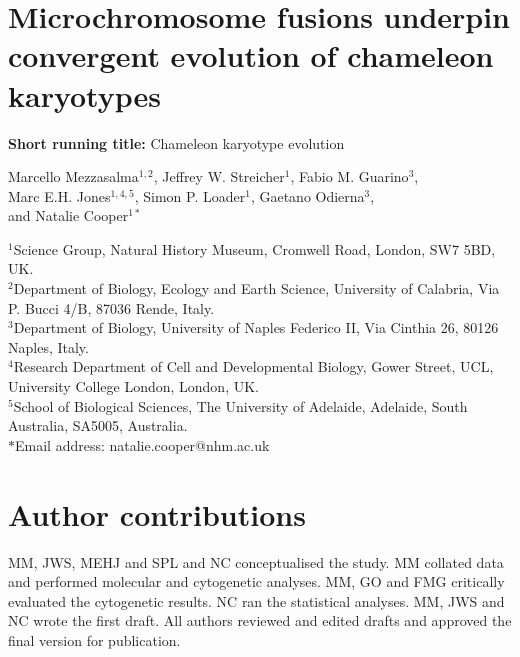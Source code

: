 \documentclass[a4paper, 12pt]{article}
\begin{document}

\section*{Microchromosome fusions underpin convergent evolution of chameleon karyotypes}

\textbf{Short running title:} Chameleon karyotype evolution\\

\begin{centering}

Marcello Mezzasalma$^{1,2}$, 
Jeffrey W. Streicher$^{1}$, 
Fabio M. Guarino$^{3}$,\\ 
Marc E.H. Jones$^{1,4,5}$, 
Simon P. Loader$^{1}$, 
Gaetano Odierna$^{3}$,\\ 
and Natalie Cooper$^{1*}$

\end{centering}

  $^1$Science Group, Natural History Museum, Cromwell Road, London, SW7 5BD, UK.\\
  $^2$Department of Biology, Ecology and Earth Science, University of Calabria, Via P. Bucci 4/B, 87036 Rende, Italy.\\
  $^3$Department of Biology, University of Naples Federico II, Via Cinthia 26, 80126 Naples, Italy.\\
  $^4$Research Department of Cell and Developmental Biology, Gower Street, UCL, University College London, London, UK.\\ 
  $^5$School of Biological Sciences, The University of Adelaide, Adelaide, South Australia, SA5005, Australia.\\
  $*$Email address: natalie.cooper@nhm.ac.uk\\


\section*{Author contributions}
MM, JWS, MEHJ and SPL and NC conceptualised the study. MM collated data and performed molecular and cytogenetic analyses. MM, GO and FMG critically evaluated the cytogenetic results. NC ran the statistical analyses. MM, JWS and NC wrote the first draft. All authors reviewed and edited drafts and approved the final version for publication.
\end{document}
